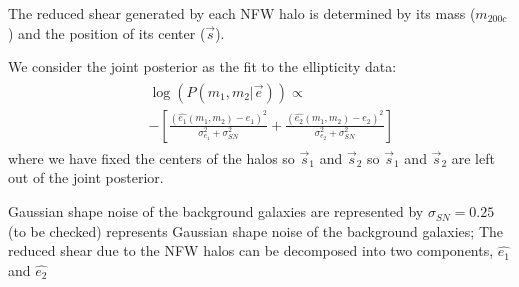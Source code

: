 The reduced shear generated by each NFW halo is determined by its
mass ($m_{200c}$) and the position of its center ($\vec{s}$). 
\par
We consider the joint posterior as the fit to the ellipticity data:
\begin{align}
    &\begin{aligned}
    &\log(P( m_{1}, m_{2} | \vec{e} )) \propto\\
    &-\left[\frac{(\hat{e_1}(m_1, m_2) - e_1)^2
    }{\sigma_{e_1}^2+\sigma_{SN}^2 }+ 
    \frac{(\hat{e_2}(m_1, m_2) - e_2)^2
    }{\sigma_{e_2}^2+\sigma_{SN}^2 }\right] \label{eqn:jointposterior} 
    \end{aligned}
\end{align} 
where we have fixed the centers of the halos so $\vec{s}_1$ and $\vec{s}_2$
so $\vec{s}_1$ and $\vec{s}_2$ are left out of the joint posterior.

Gaussian shape noise of the background galaxies are represented by $\sigma_{SN} = 0.25$(to be checked) represents Gaussian shape noise
of the background galaxies; The reduced shear due to the NFW halos can be
decomposed into two components, $\hat{e_1}$ and $\hat{e_2}$  

